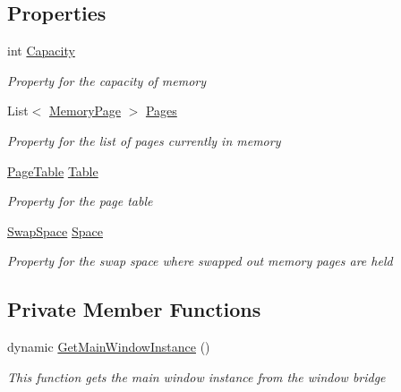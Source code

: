 \subsection*{Properties}
\begin{DoxyCompactItemize}
\item 
int \hyperlink{class_c_p_u___o_s___simulator_1_1_memory_1_1_physical_memory_af04d50462367295af1c8b4f9f1a75730}{Capacity}
\begin{DoxyCompactList}\small\item\em Property for the capacity of memory \end{DoxyCompactList}\item 
List$<$ \hyperlink{class_c_p_u___o_s___simulator_1_1_memory_1_1_memory_page}{Memory\+Page} $>$ \hyperlink{class_c_p_u___o_s___simulator_1_1_memory_1_1_physical_memory_ad099afa411ad366a734457fd824fea06}{Pages}
\begin{DoxyCompactList}\small\item\em Property for the list of pages currently in memory \end{DoxyCompactList}\item 
\hyperlink{class_c_p_u___o_s___simulator_1_1_memory_1_1_page_table}{Page\+Table} \hyperlink{class_c_p_u___o_s___simulator_1_1_memory_1_1_physical_memory_aaa669f8a92820bf792dd2ccb553254c9}{Table}
\begin{DoxyCompactList}\small\item\em Property for the page table \end{DoxyCompactList}\item 
\hyperlink{class_c_p_u___o_s___simulator_1_1_memory_1_1_swap_space}{Swap\+Space} \hyperlink{class_c_p_u___o_s___simulator_1_1_memory_1_1_physical_memory_a5d0fceb09f51edcfb4f483b5e8a9508a}{Space}
\begin{DoxyCompactList}\small\item\em Property for the swap space where swapped out memory pages are held \end{DoxyCompactList}\end{DoxyCompactItemize}
\subsection*{Private Member Functions}
\begin{DoxyCompactItemize}
\item 
dynamic \hyperlink{class_c_p_u___o_s___simulator_1_1_memory_1_1_physical_memory_a78a9b68e70b5f44ac1d38fc653b51724}{Get\+Main\+Window\+Instance} ()
\begin{DoxyCompactList}\small\item\em This function gets the main window instance from the window bridge \end{DoxyCompactList}\end{DoxyCompactItemize}
